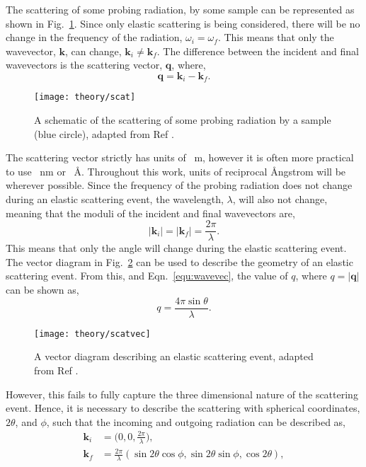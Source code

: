 The scattering of some probing radiation, by some sample can be represented as shown in Fig.~\ref{fig:scat}.
Since only elastic scattering is being considered, there will be no change in the frequency of the radiation, $\omega_i = \omega_f$.
This means that only the wavevector, $\mathbf{k}$, can change, $\mathbf{k}_i\neq \mathbf{k}_f$.
The difference between the incident and final wavevectors is the scattering vector, $\mathbf{q}$, where,
%
\begin{equation}
	\mathbf{q} = \mathbf{k}_i - \mathbf{k}_f.
\end{equation}
%
%
\begin{figure}
	\centering
	\texttt{[image: theory/scat]}
	\caption{A schematic of the scattering of some probing radiation by a sample (blue circle), adapted from Ref \cite{Sivia2011}.}
	\label{fig:scat}
\end{figure}
%
The scattering vector strictly has units of \si{\per\meter}, however it is often more practical to use \si{\per\nano\meter} or \si{\per\angstrom}.
Throughout this work, units of reciprocal \AA ngstrom will be wherever possible.
Since the frequency of the probing radiation does not change during an elastic scattering event, the wavelength, $\lambda$, will also not change, meaning that the moduli of the incident and final wavevectors are,
%
\begin{equation}
	|\mathbf{k}_i| = |\mathbf{k}_f|=\frac{2\pi}{\lambda}.
	\label{equ:wavevec}
\end{equation}
%
This means that only the angle will change during the elastic scattering event.
The vector diagram in Fig.~\ref{fig:scatvec} can be used to describe the geometry of an elastic scattering event.
From this, and Eqn.~\ref{equ:wavevec}, the value of $q$, where $q = |\mathbf{q}|$ can be shown as,
%
\begin{equation}
	q = \frac{4\pi\sin{\theta}}{\lambda}.
	\label{equ:theq}
\end{equation}
%
%
\begin{figure}
	\centering
	\texttt{[image: theory/scatvec]}
	\caption{A vector diagram describing an elastic scattering event, adapted from Ref \cite{Sivia2011}.}
	\label{fig:scatvec}
\end{figure}
%
However, this fails to fully capture the three dimensional nature of the scattering event.
Hence, it is necessary to describe the scattering with spherical coordinates, $2\theta$, and $\phi$, such that the incoming and outgoing radiation can be described as,
%
\begin{equation}
	\begin{aligned}
		\mathbf{k}_i & = \bigg(0, 0, \frac{2\pi}{\lambda}\bigg), \\
		\mathbf{k}_f & = \frac{2\pi}{\lambda}(\sin{2\theta}\cos{\phi}, \sin{2\theta}\sin{\phi}, \cos{2\theta}),
	\end{aligned}
\end{equation}
